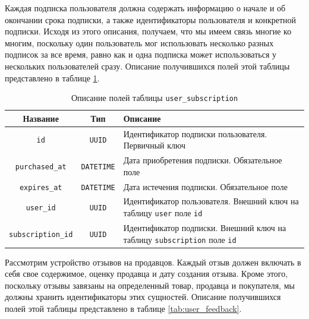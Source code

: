 \documentclass[a4paper,14pt]{extarticle}
\begin{document}
Каждая подписка пользователя должна содержать информацию о начале и об окончании срока подписки, а также идентификаторы пользователя и конкретной подписки. Исходя из этого описания, получаем, что мы имеем связь многие ко многим, поскольку один пользователь мог использовать несколько разных подписок за все время, равно как и одна подписка может использоваться у нескольких пользователей сразу. Описание получившихся полей этой таблицы представлено в таблице \ref{tab:user_subscription}.

\begin{center}
    \begin{longtable}{|c|c|>{\centering\arraybackslash}m{9.2cm}|}
        \caption{Описание полей таблицы \texttt{user\_subscription}}
        \label{tab:user_subscription}
        \\
        \hline
        \textbf{Название}         & \textbf{Тип}      & \textbf{Описание}                                                                      \\
        \hline
        \texttt{id}               & \texttt{UUID}     & Идентификатор подписки пользователя. Первичный ключ                                    \\
        \hline
        \texttt{purchased\_at}    & \texttt{DATETIME} & Дата приобретения подписки. Обязательное поле                                          \\
        \hline
        \texttt{expires\_at}      & \texttt{DATETIME} & Дата истечения подписки. Обязательное поле                                             \\
        \hline
        \texttt{user\_id}         & \texttt{UUID}     & Идентификатор пользователя. Внешний ключ на таблицу \texttt{user} поле \texttt{id}     \\
        \hline
        \texttt{subscription\_id} & \texttt{UUID}     & Идентификатор подписки. Внешний ключ на таблицу \texttt{subscription} поле \texttt{id} \\
        \hline
    \end{longtable}
\end{center}

Рассмотрим устройство отзывов на продавцов. Каждый отзыв должен включать в себя свое содержимое, оценку продавца и дату создания отзыва. Кроме этого, поскольку отзывы завязаны на определенный товар, продавца и покупателя, мы должны хранить идентификаторы этих сущностей. Описание получившихся полей этой таблицы представлено в таблице \ref{tab:user_feedback}.
\end{document}
